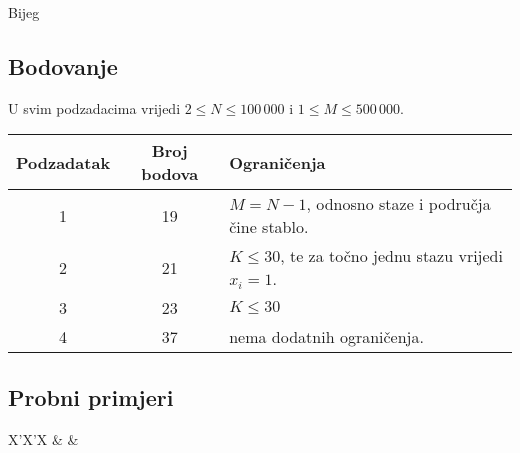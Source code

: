 \begin{statement}[
  problempoints=100,
  timelimit=1 sekunda,
  memorylimit=512 MiB,
]{Bijeg}
\subsection*{Bodovanje}

U svim podzadacima vrijedi $2 \le N \le 100\,000$ i $1 \le M \le 500\,000$.

{\renewcommand{\arraystretch}{1.4}
  \setlength{\tabcolsep}{6pt}
  \begin{tabular}{ccl}
   Podzadatak & Broj bodova & Ograničenja \\ \midrule
    1 & 19 & $M = N - 1$, odnosno staze i područja čine stablo. \\
    2 & 21 & $K \le 30$, te za točno jednu stazu vrijedi $x_i = 1$. \\
    3 & 23 & $K \le 30$ \\
    4 & 37 & nema dodatnih ograničenja.
\end{tabular}}

\subsection*{Probni primjeri}
\begin{tabularx}{\textwidth}{X'X'X}
 &
 &
\end{tabularx}

\end{statement}

